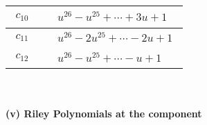 \documentclass[1p]{elsarticle_modified}
\theoremstyle{definition}
\begin{document}
\begin{tabular}{m{50pt}|m{274pt}}
\hline $$\begin{aligned}c_{10}\end{aligned}$$&$\begin{aligned}
&u^{26}- u^{25}+\cdots+3 u+1
\end{aligned}$\\
\hline $$\begin{aligned}c_{11}\end{aligned}$$&$\begin{aligned}
&u^{26}-2 u^{25}+\cdots-2 u+1
\end{aligned}$\\
\hline $$\begin{aligned}c_{12}\end{aligned}$$&$\begin{aligned}
&u^{26}- u^{25}+\cdots- u+1
\end{aligned}$\\
\hline
\end{tabular}\\~\\
\newpage\renewcommand{\arraystretch}{1}
\flushleft \textbf{(v) Riley Polynomials at the component}\newline \\
\end{document}
